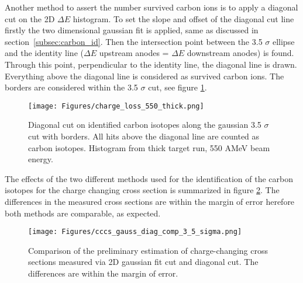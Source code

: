 \begin{appendices}
Another method to assert the number survived carbon ions is to apply a diagonal cut on the 2D $\Delta E$ histogram. To set the slope and offset of the diagonal cut line firstly the two dimensional gaussian fit is applied, same as discussed in section~\ref{subsec:carbon_id}. Then the intersection point between the 3.5 $\sigma$ ellipse and the identity line ($\Delta E$ upstream anodes = $\Delta E$ downstream anodes) is found. Through this point, perpendicular to the identity line, the diagonal line is drawn. Everything above the diagonal line is considered as survived carbon ions. The borders are considered within the 3.5 $\sigma$ cut, see figure \ref{fig:diagonal_cut_twim}. 
\begin{figure}[htpb]
    \centering
    \texttt{[image: Figures/charge\_loss\_550\_thick.png]}
    \caption{
    Diagonal cut on identified carbon isotopes along the gaussian 3.5 $\sigma$ cut with borders. All hits above the diagonal line are counted as carbon isotopes. Histogram from thick target run, 550 AMeV beam energy.
     }
    \label{fig:diagonal_cut_twim}
\end{figure}
The effects of the two different methods used for the identification of the carbon isotopes for the charge changing cross section is summarized in figure \ref{fig:cccs_gaus_vs_diag}. The differences in the measured cross sections are within the margin of error herefore both methods are comparable, as expected.
\begin{figure}[htpb]
    \centering
    \texttt{[image: Figures/cccs\_gauss\_diag\_comp\_3\_5\_sigma.png]}
    \caption{
    Comparison of the preliminary estimation of charge-changing cross sections measured via 2D gaussian fit cut and diagonal cut. The differences are within the margin of error.
     }
    \label{fig:cccs_gaus_vs_diag}
\end{figure}

\end{appendices}
